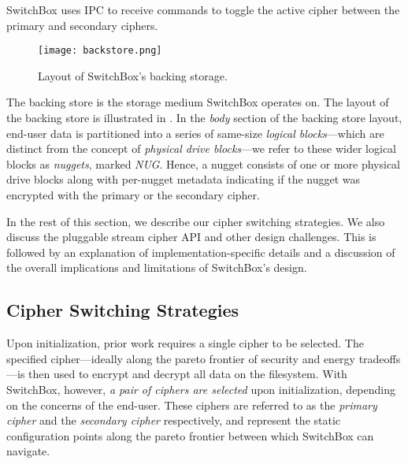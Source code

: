 SwitchBox uses IPC to receive commands to toggle the active cipher between the
primary and secondary ciphers. 

\begin{figure}[t]
 \centering
  \texttt{[image: backstore.png]}
   \caption{Layout of SwitchBox's backing storage.}\label{fig:backstore2}
\end{figure}

The backing store is the storage medium SwitchBox operates on. The layout of the
backing store is illustrated in . In the \textit{body} section
of the backing store layout, end-user data is partitioned into a series of
same-size \emph{logical blocks}---which are distinct from the concept of
\emph{physical drive blocks}---we refer to these wider logical blocks as
\emph{nuggets}, marked \textit{NUG}. Hence, a nugget consists of one or more
physical drive blocks along with per-nugget metadata indicating if the nugget
was encrypted with the primary or the secondary cipher. 

In the rest of this section, we describe our cipher switching strategies. We
also discuss the pluggable stream cipher API and other design challenges. This
is followed by an explanation of implementation-specific details and a
discussion of the overall implications and limitations of SwitchBox's design.

\subsection{Cipher Switching Strategies}

Upon initialization, prior work requires a single cipher to be selected. The
specified cipher---ideally along the pareto frontier of security and energy
tradeoffs---is then used to encrypt and decrypt all data on the filesystem. With
SwitchBox, however, \emph{a pair of ciphers are selected} upon initialization,
depending on the concerns of the end-user. These ciphers are referred to as the
\emph{primary cipher} and the \emph{secondary cipher} respectively, and
represent the static configuration points along the pareto frontier between
which SwitchBox can navigate. 

